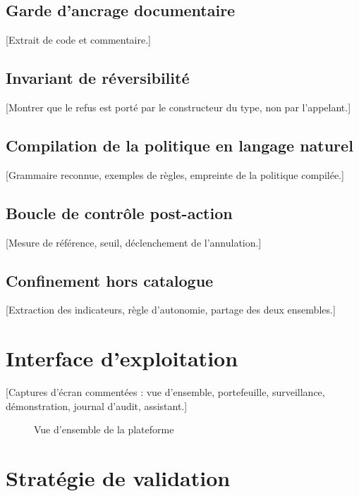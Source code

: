 \subsection{Garde d'ancrage documentaire}
[Extrait de code et commentaire.]

\subsection{Invariant de r\'eversibilit\'e}
[Montrer que le refus est port\'e par le constructeur du type, non par l'appelant.]

\subsection{Compilation de la politique en langage naturel}
[Grammaire reconnue, exemples de r\`egles, empreinte de la politique compil\'ee.]

\subsection{Boucle de contr\^ole post-action}
[Mesure de r\'ef\'erence, seuil, d\'eclenchement de l'annulation.]

\subsection{Confinement hors catalogue}
[Extraction des indicateurs, r\`egle d'autonomie, partage des deux ensembles.]

\section{Interface d'exploitation}
[Captures d'\'ecran comment\'ees : vue d'ensemble, portefeuille, surveillance,
d\'emonstration, journal d'audit, assistant.]

\begin{figure}[H]
    \centering
    \caption{Vue d'ensemble de la plateforme}
    \label{fig:capture-dashboard}
\end{figure}

\section{Strat\'egie de validation}

